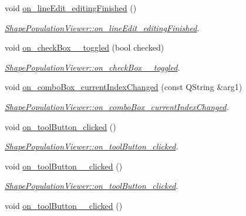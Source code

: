 \begin{DoxyCompactItemize}
void \hyperlink{class_shape_population_viewer_a06a4d48a520555530733a673684ba4f4}{on\-\_\-line\-Edit\-\_\-editing\-Finished} ()
\begin{DoxyCompactList}\small\item\em \hyperlink{class_shape_population_viewer_a06a4d48a520555530733a673684ba4f4}{Shape\-Population\-Viewer\-::on\-\_\-line\-Edit\-\_\-editing\-Finished}. \end{DoxyCompactList}\item 
void \hyperlink{class_shape_population_viewer_a9114bc279e8e03e21480e184c1057c8f}{on\-\_\-check\-Box\-\_\-\_\-toggled} (bool checked)
\begin{DoxyCompactList}\small\item\em \hyperlink{class_shape_population_viewer_a9114bc279e8e03e21480e184c1057c8f}{Shape\-Population\-Viewer\-::on\-\_\-check\-Box\-\_\-\_\-toggled}. \end{DoxyCompactList}\item 
void \hyperlink{class_shape_population_viewer_a4516673df0b16aa9b783e4b64f56fad8}{on\-\_\-combo\-Box\-\_\-current\-Index\-Changed} (const Q\-String \&arg1)
\begin{DoxyCompactList}\small\item\em \hyperlink{class_shape_population_viewer_a4516673df0b16aa9b783e4b64f56fad8}{Shape\-Population\-Viewer\-::on\-\_\-combo\-Box\-\_\-current\-Index\-Changed}. \end{DoxyCompactList}\item 
void \hyperlink{class_shape_population_viewer_afe0890a97a545e451c4b9e745fd812f0}{on\-\_\-tool\-Button\-\_\-clicked} ()
\begin{DoxyCompactList}\small\item\em \hyperlink{class_shape_population_viewer_afe0890a97a545e451c4b9e745fd812f0}{Shape\-Population\-Viewer\-::on\-\_\-tool\-Button\-\_\-clicked}. \end{DoxyCompactList}\item 
void \hyperlink{class_shape_population_viewer_a6d153b4e3b16b044581b842cdd638f4d}{on\-\_\-tool\-Button\-\_\-\_\-clicked} ()
\begin{DoxyCompactList}\small\item\em \hyperlink{class_shape_population_viewer_afe0890a97a545e451c4b9e745fd812f0}{Shape\-Population\-Viewer\-::on\-\_\-tool\-Button\-\_\-clicked}. \end{DoxyCompactList}\item 
void \hyperlink{class_shape_population_viewer_a23d32bc06c2b04a34cdb504ce154c30e}{on\-\_\-tool\-Button\-\_\-\_\-clicked} ()

\end{DoxyCompactItemize}
